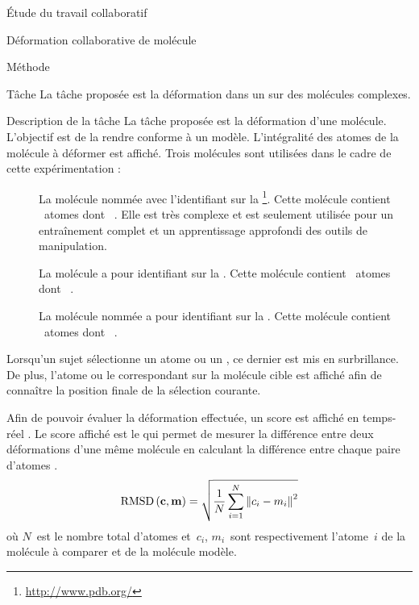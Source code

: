 \documentclass[myfrancais]{mythesis}
\begin{document}
\begin{mypart}{Étude du travail collaboratif}
\begin{mychapter}{Déformation collaborative de molécule}
\begin{mysection}{Méthode}
\begin{mysubsection}{Tâche}
					La tâche proposée est la déformation dans un  sur des molécules complexes.
					\begin{mysubsubsection}{Description de la tâche}
						La tâche proposée est la déformation d'une molécule.
						L'objectif est de la rendre conforme à un modèle.
						L'intégralité des atomes de la molécule à déformer est affiché.
						Trois molécules sont utilisées dans le cadre de cette expérimentation :
						\begin{description}
							\item[\myPrion]
								La molécule nommée \myPrion {} avec l'identifiant \myPDB {} sur la \myPDBbase\footnote{\url{http://www.pdb.org/}}.
								Cette molécule contient ~atomes dont ~.
								Elle est très complexe et est seulement utilisée pour un entraînement complet et un apprentissage approfondi des outils de manipulation.
							\item[\myTRPZIPPER]
								La molécule \myTRPZIPPER {} a pour identifiant \myPDB {} sur la \myPDBbase\footnotemark[\value{footnote}].
								Cette molécule contient ~atomes dont ~.
							\item[\myTRPCAGE]
								La molécule nommée \myTRPCAGE {} a pour identifiant \myPDB {} sur la \myPDBbase\footnotemark[\value{footnote}].
								Cette molécule contient ~atomes dont ~.
						\end{description}

						Lorsqu'un sujet sélectionne un atome ou un , ce dernier est mis en surbrillance.
						De plus, l'atome ou le  correspondant sur la molécule cible est affiché afin de connaître la position finale de la sélection courante.

						Afin de pouvoir évaluer la déformation effectuée, un score est affiché en temps-réel .
						Le score affiché est le  qui permet de mesurer la différence entre deux déformations d'une même molécule en calculant la différence entre chaque paire d'atomes .
						\begin{equation}\label{equ-RMSD}
							\mathrm{RMSD}\left(\mathbf{c},\mathbf{m}\right) = \sqrt{\frac{1}{N}\sum_{i=1}^{N}\left\| c_i - m_i \right\|^2}
						\end{equation}
						où $N$~est le nombre total d'atomes et~$c_i$, $m_i$~sont respectivement l'atome~$i$ de la molécule à comparer et de la molécule modèle.


\end{mysubsubsection}
\end{mysubsection}
\end{mysection}
\end{mychapter}
\end{mypart}
\end{document}
